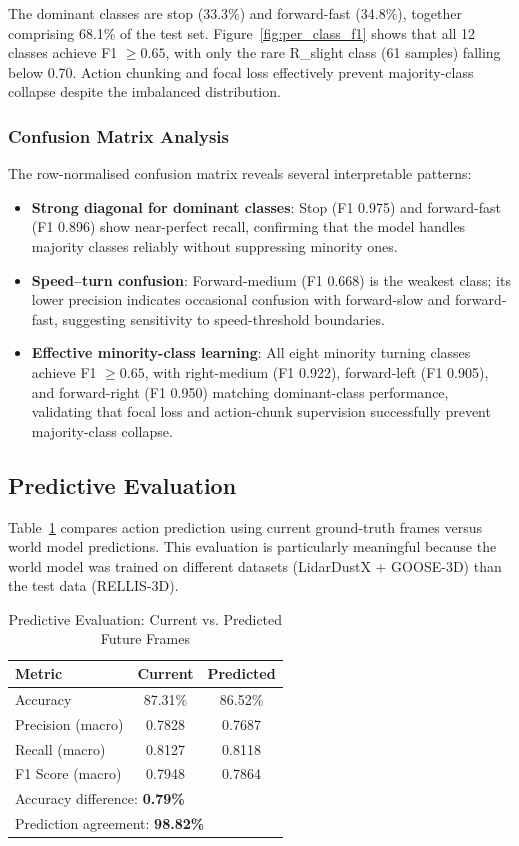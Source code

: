 \documentclass[sensors,article,submit,pdftex,moreauthors]{Definitions/mdpi}
\begin{document}
The dominant classes are stop (33.3\%) and forward-fast (34.8\%), together comprising 68.1\% of the test set. Figure~\ref{fig:per_class_f1} shows that all 12 classes achieve F1 $\geq 0.65$, with only the rare R\_slight class (61 samples) falling below 0.70. Action chunking and focal loss effectively prevent majority-class collapse despite the imbalanced distribution.

\subsubsection{Confusion Matrix Analysis}
The row-normalised confusion matrix reveals several interpretable patterns:
\begin{itemize}
    \item \textbf{Strong diagonal for dominant classes}: Stop (F1 0.975) and forward-fast (F1 0.896) show near-perfect recall, confirming that the model handles majority classes reliably without suppressing minority ones.
    \item \textbf{Speed--turn confusion}: Forward-medium (F1 0.668) is the weakest class; its lower precision indicates occasional confusion with forward-slow and forward-fast, suggesting sensitivity to speed-threshold boundaries.
    \item \textbf{Effective minority-class learning}: All eight minority turning classes achieve F1 $\geq 0.65$, with right-medium (F1 0.922), forward-left (F1 0.905), and forward-right (F1 0.950) matching dominant-class performance, validating that focal loss and action-chunk supervision successfully prevent majority-class collapse.
\end{itemize}

\subsection{Predictive Evaluation}

Table~\ref{tab:predictive} compares action prediction using current ground-truth frames versus world model predictions. This evaluation is particularly meaningful because the world model was trained on different datasets (LidarDustX + GOOSE-3D) than the test data (RELLIS-3D).

\begin{table}[h]
\caption{Predictive Evaluation: Current vs. Predicted Future Frames}
\label{tab:predictive}
\centering
\begin{tabular}{lcc}
\toprule
Metric & Current & Predicted \\
\midrule
Accuracy & 87.31\% & 86.52\% \\
Precision (macro) & 0.7828 & 0.7687 \\
Recall (macro) & 0.8127 & 0.8118 \\
F1 Score (macro) & 0.7948 & 0.7864 \\
\midrule
\multicolumn{3}{l}{Accuracy difference: \textbf{0.79\%}} \\
\multicolumn{3}{l}{Prediction agreement: \textbf{98.82\%}} \\
\bottomrule
\end{tabular}
\end{table}
\end{document}
